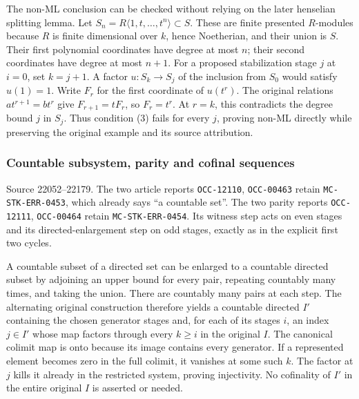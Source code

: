 The non-ML conclusion can be checked without relying on the later henselian splitting lemma. Let \(S_n=R\langle1,t,\ldots,t^n\rangle\subset S\). These are finite presented \(R\)-modules because \(R\) is finite dimensional over \(k\), hence Noetherian, and their union is \(S\). Their first polynomial coordinates have degree at most \(n\); their second coordinates have degree at most \(n+1\). For a proposed stabilization stage \(j\) at \(i=0\), set \(k=j+1\). A factor \(u:S_k\to S_j\) of the inclusion from \(S_0\) would satisfy \(u(1)=1\). Write \(F_r\) for the first coordinate of \(u(t^r)\). The original relations \(at^{r+1}=bt^r\) give \(F_{r+1}=tF_r\), so \(F_r=t^r\). At \(r=k\), this contradicts the degree bound \(j\) in \(S_j\). Thus condition (3) fails for every \(j\), proving non-ML directly while preserving the original example and its source attribution.

\subsubsection{Countable subsystem, parity and cofinal sequences}\label{algebra-proof-013-countable-subsystem-parity-and-cofinal-sequences}

Source 22052--22179. The two article reports \texttt{OCC-12110}, \texttt{OCC-00463} retain \texttt{MC-\AlgebraIdentifierBreak{}STK-\AlgebraIdentifierBreak{}ERR-\AlgebraIdentifierBreak{}0453}, which already says ``a countable set''. The two parity reports \texttt{OCC-12111}, \texttt{OCC-00464} retain \texttt{MC-\AlgebraIdentifierBreak{}STK-\AlgebraIdentifierBreak{}ERR-\AlgebraIdentifierBreak{}0454}. Its witness step acts on even stages and its directed-enlargement step on odd stages, exactly as in the explicit first two cycles.

A countable subset of a directed set can be enlarged to a countable directed subset by adjoining an upper bound for every pair, repeating countably many times, and taking the union. There are countably many pairs at each step. The alternating original construction therefore yields a countable directed \(I'\) containing the chosen generator stages and, for each of its stages \(i\), an index \(j\in I'\) whose map factors through every \(k\geq i\) in the original \(I\). The canonical colimit map is onto because its image contains every generator. If a represented element becomes zero in the full colimit, it vanishes at some such \(k\). The factor at \(j\) kills it already in the restricted system, proving injectivity. No cofinality of \(I'\) in the entire original \(I\) is asserted or needed.

